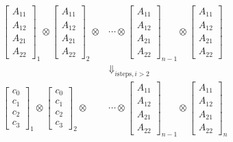 \documentclass[twocolumn]{article}
\begin{document}
\begin{eqnarray}
    &\begin{bmatrix}
        A_{11} \\
        A_{12} \\
        A_{21} \\
        A_{22}
    \end{bmatrix}_1 \otimes
    \begin{bmatrix}
        A_{11} \\
        A_{12} \\
        A_{21} \\
        A_{22}
    \end{bmatrix}_2 \otimes
    &\cdots \otimes
    \begin{bmatrix}
        A_{11} \\
        A_{12} \\
        A_{21} \\
        A_{22}
    \end{bmatrix}_{n-1} \otimes
    \begin{bmatrix}
        A_{11} \\
        A_{12} \\
        A_{21} \\
        A_{22}
    \end{bmatrix}
    \nonumber\\
    & &\Downarrow_{i \text{steps}, i>2} \label{eq:vec_tpd}\\
    &\begin{bmatrix}
        c_0\\
        c_1\\
        c_2\\
        c_3
    \end{bmatrix}_1 \otimes
    \begin{bmatrix}
        c_0\\
        c_1\\
        c_2\\
        c_3
    \end{bmatrix}_2 \otimes
    &\cdots \otimes
    \begin{bmatrix}
        A_{11} \\
        A_{12} \\
        A_{21} \\
        A_{22}
    \end{bmatrix}_{n-1} \otimes
    \begin{bmatrix}
        A_{11} \\
        A_{12} \\
        A_{21} \\
        A_{22}
    \end{bmatrix}_n\nonumber
\end{eqnarray}
\end{document}
